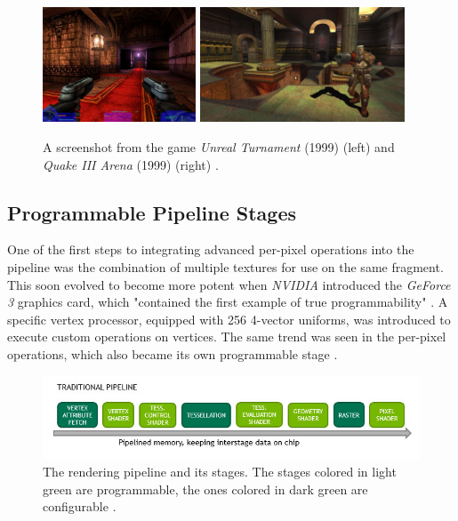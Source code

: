 \begin{figure}[h]
    \centering
    \includegraphics[width=172.5px]{images/graphics/unreal-turnament.jpg}
    \includegraphics[width=230px]{images/graphics/quake-iii-arena.jpg}
    \caption{A screenshot from the game \emph{Unreal Turnament} (1999) (left) and \emph{Quake III Arena} (1999) 
    (right) \cite{GamespotUnrealTurnament, GameWatcher2006}.}
    \label{fig:unreal-turnament-quake-arena}
\end{figure}


\subsection*{Programmable Pipeline Stages}
 
One of the first steps to integrating advanced per-pixel operations into the pipeline was the combination of
multiple textures for use on the same fragment. This soon evolved to become more potent when \emph{NVIDIA} 
introduced the \emph{GeForce 3} graphics card, which "contained the first example of true programmability" 
\cite{KhronosProgramibility2024}. A specific vertex processor, equipped with 256 4-vector uniforms, was 
introduced to execute custom operations on vertices. The same trend was seen in the per-pixel operations, 
which also became its own programmable stage \cite{KhronosProgramibility2024}. \\

\begin{figure}[h]
    \centering
    \includegraphics[width=\linewidth]{images/graphics/traditional-rendering-pipeline.jpg}
    \caption{The rendering pipeline and its stages. The stages colored in light green are programmable, 
    the ones colored in dark green are configurable \cite{Kubisch2018}.}
    \label{fig:traditional-rendering-pipeline}
\end{figure}

